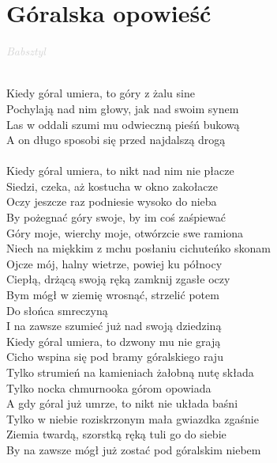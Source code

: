 \documentclass[a5paper, 10pt]{book}
\begin{document}
\section{Góralska opowieść}\textcolor{lightgray}{\textit{Babsztyl}}\\~\\
\begin{minipage}[t]{0.8\textwidth}
  Kiedy góral umiera, to góry z żalu sine\\
  Pochylają nad nim głowy, jak nad swoim synem\\
  Las w oddali szumi mu odwieczną pieśń bukową\\
  A on długo sposobi się przed najdalszą drogą\\
  \\
  Kiedy góral umiera, to nikt nad nim nie płacze\\
  Siedzi, czeka, aż kostucha w okno zakołacze\\
  Oczy jeszcze raz podniesie wysoko do nieba\\
  By pożegnać góry swoje, by im coś zaśpiewać\\

  \hspace*{5mm}Góry moje, wierchy moje, otwórzcie swe ramiona\\
  \hspace*{5mm}Niech na miękkim z mchu posłaniu cichuteńko skonam\\
  \hspace*{5mm}Ojcze mój, halny wietrze, powiej ku północy\\
  \hspace*{5mm}Ciepłą, drżącą swoją ręką zamknij zgasłe oczy\\
  \hspace*{5mm}Bym mógł w ziemię wrosnąć, strzelić potem\\
  \hspace*{5mm}Do słońca smreczyną\\
  \hspace*{5mm}I na zawsze szumieć już nad swoją dziedziną\\

  Kiedy góral umiera, to dzwony mu nie grają\\
  Cicho wspina się pod bramy góralskiego raju\\
  Tylko strumień na kamieniach żałobną nutę składa\\
  Tylko nocka chmurnooka górom opowiada\\

  A gdy góral już umrze, to nikt nie układa baśni\\
  Tylko w niebie roziskrzonym mała gwiazdka zgaśnie\\
  Ziemia twardą, szorstką ręką tuli go do siebie\\
  By na zawsze mógł już zostać pod góralskim niebem\\
\end{minipage}
\end{document}
